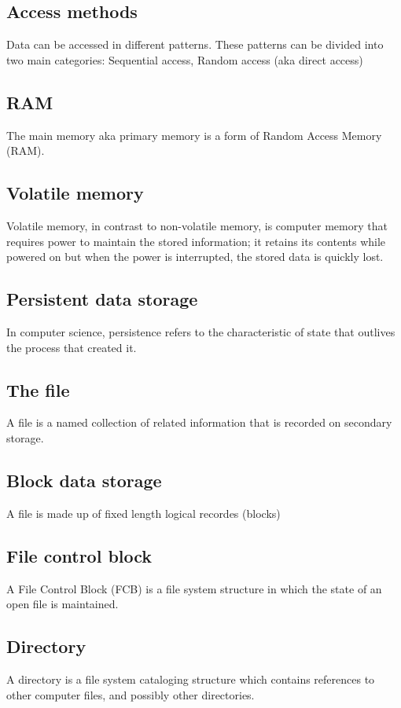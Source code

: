 \begin{multicols}{2}
\subsection{Access methods}
Data can be accessed in different patterns. These
patterns can be divided into two main categories:
Sequential access,
Random access (aka direct access)

\subsection{RAM}
The main memory aka primary memory
is a form of Random Access Memory (RAM).

\subsection{Volatile memory}
Volatile memory, in contrast to non-volatile memory, is computer
memory that requires power to maintain the stored
information; it retains its contents while powered on but when
the power is interrupted, the stored data is quickly lost.

\subsection{Persistent data storage}
In computer science, persistence refers to the
characteristic of state that outlives the process
that created it.

\subsection{The file}
A file is a named collection of related
information that is recorded on
secondary storage.

\subsection{Block data storage}
A file is made up of fixed length logical recordes (blocks)

\subsection{File control block}
A File Control Block (FCB) is a file
system structure in which the state of an
open file is maintained.

\subsection{Directory}
 A directory is a file system cataloging
structure which contains references to
other computer files, and possibly other directories.


\end{multicols}
